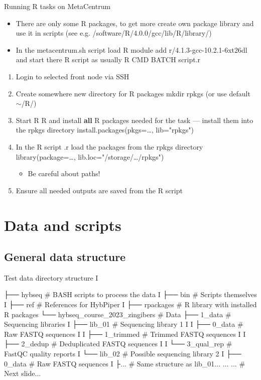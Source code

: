 \documentclass[compress, ucs, xelatex, 11pt, xcolor=x11names, aspectratio=169,
	hyperref={
		bookmarks=true,
		unicode=true,
		colorlinks=true,
		pdftitle={HybSeq course},
		plainpages=false,
		pdfauthor={Vojtech Zeisek},
		pdfsubject={Practical processing of HybSeq target enrichment sequencing data on computing grids like MetaCentrum},
		pdfcreator={XeLaTeX},
		pdfkeywords={BASH, command line, GNU, HybSeq, Linux, MetaCentrum, sequencing shell, target enrichment},
		linkcolor=Turquoise4, %
		anchorcolor=DodgerBlue4, %
		citecolor=DodgerBlue4, %
		filecolor=DodgerBlue4, %
		menucolor=Tan4, %
		urlcolor=DarkOliveGreen4, %
		pdftex},
	url={hyphens, lowtilde} %
	]{beamer}
\renewcommand{\texttt}[1]{\colorbox{Cornsilk2}{{\ttfamily #1}}}
\renewcommand{\alert}[1]{\textcolor{OrangeRed3}{#1}}
\begin{document}
\begin{frame}{Running R tasks on MetaCentrum}
	\begin{itemize}
		\item There are only some R packages, to get more create own package library and use it in scripts (see e.g. \texttt{/software/R/4.0.0/gcc/lib/R/library/})
		\item In the \texttt{metacentrum.sh} script load R \texttt{module add r/4.1.3-gcc-10.2.1-6xt26dl} and start there R script as usually \texttt{R CMD BATCH script.r}
	\end{itemize}
	\begin{enumerate}
		\item Login to selected front node via SSH
		\item Create somewhere new directory for R packages \texttt{mkdir rpkgs} (or use default \texttt{$\sim$/R/})
		\item Start R \texttt{R} and install \textbf{all} R packages needed for the task --- install them into the \texttt{rpkgs} directory \texttt{install.packages(pkgs=\ldots, lib="rpkgs")}
		\item In the R script \texttt{*.r} load the packages from the \texttt{rpkgs} directory \texttt{library(package=\ldots, lib.loc="/storage/\ldots/rpkgs")}
		\begin{itemize}
			\item \alert{Be careful about paths!}
		\end{itemize}
		\item Ensure all needed outputs are saved from the R script
	\end{enumerate}
\end{frame}

\section{Data and scripts}

\subsection{General data structure}

\begin{frame}[fragile]{Test data directory structure I}
	\label{datastructure}
	\begin{bashcode}
    ├── hybseq # BASH scripts to process the data
    I   ├── bin # Scripts themselves
    I   ├── ref # References for HybPiper
    I   ├── rpackages # R library with installed R packages
    └── hybseq_course_2023_zingibers # Data
        ├── 1_data # Sequencing libraries
        I   ├── lib_01 # Sequencing library 1
        I   I   ├── 0_data # Raw FASTQ sequences
        I   I   ├── 1_trimmed # Trimmed FASTQ sequences
        I   I   ├── 2_dedup # Deduplicated FASTQ sequences
        I   I   └── 3_qual_rep # FastQC quality reports
        I   └── lib_02 # Possible sequencing library 2
        I       ├── 0_data # Raw FASTQ sequences
        I       ├... # Same structure as lib_01...
        ...     ... # Next slide...
	\end{bashcode}
\end{frame}
\end{document}
